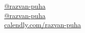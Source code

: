 \documentclass{modernsimplecv}
\begin{document}
\begin{minipage}[t]{\textwidth}
\begin{shaded*}
\begin{multicols}{2}
\begin{minipage}[t]{0.4\textwidth}
                    \faGithub~ \href{https://github.com/razvan-puha}{@razvan-puha} \\
                    \faLinkedin~ \href{https://www.linkedin.com/in/razvan-petru-puha}{@razvan-puha} \\
                    \faCalendar~ \href{https://calendly.com/puha-razvan-office}{calendly.com/razvan-puha}

                \end{minipage}
                
                \hfill
    
        \end{multicols}
        \end{shaded*}
    \end{minipage}\\[3pt]
    
    
    
    \subsection*{}
    \vspace{-3em}
    
\end{document}
